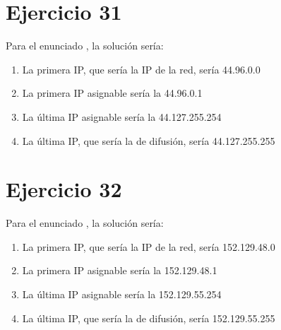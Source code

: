 \documentclass[letterpaper,10pt,spanish]{sphinxmanual}
\begin{document}
\section{Ejercicio 31}
\label{\detokenize{t2_integracion_elementos/ejercicios_subredes_ipv4/rangos_direcciones:id31}}
\sphinxAtStartPar
Para el enunciado , la solución sería:
\begin{enumerate}
%
\item {} 
\sphinxAtStartPar
La primera IP, que sería la IP de la red, sería 44.96.0.0

\item {} 
\sphinxAtStartPar
La primera IP asignable sería la 44.96.0.1

\item {} 
\sphinxAtStartPar
La última IP asignable sería la 44.127.255.254

\item {} 
\sphinxAtStartPar
La última IP, que sería la de difusión, sería 44.127.255.255

\end{enumerate}


\section{Ejercicio 32}
\label{\detokenize{t2_integracion_elementos/ejercicios_subredes_ipv4/rangos_direcciones:id32}}
\sphinxAtStartPar
Para el enunciado , la solución sería:
\begin{enumerate}
%
\item {} 
\sphinxAtStartPar
La primera IP, que sería la IP de la red, sería 152.129.48.0

\item {} 
\sphinxAtStartPar
La primera IP asignable sería la 152.129.48.1

\item {} 
\sphinxAtStartPar
La última IP asignable sería la 152.129.55.254

\item {} 
\sphinxAtStartPar
La última IP, que sería la de difusión, sería 152.129.55.255

\end{enumerate}
\end{document}

